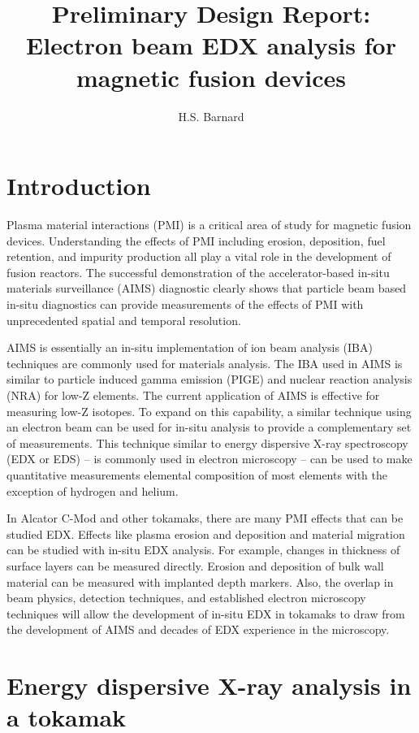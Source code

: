 \documentclass[12pt,letterpaper,final]{article}
\author{H.S. Barnard}
\title{Preliminary Design Report: Electron beam EDX analysis for magnetic fusion devices}
\begin{document}
\maketitle
%
\section{Introduction}

Plasma material interactions (PMI) is a critical area of study for magnetic fusion devices.  Understanding the effects of PMI including erosion, deposition, fuel retention, and impurity production all play a vital role in the development of fusion reactors. The successful demonstration of the accelerator-based in-situ materials surveillance (AIMS) diagnostic clearly shows that particle beam based in-situ diagnostics can provide measurements of the effects of PMI with unprecedented spatial and temporal resolution.

AIMS is essentially an in-situ implementation of ion beam analysis (IBA) techniques are commonly used for materials analysis. The IBA used in AIMS is similar to particle induced gamma emission (PIGE) and nuclear reaction analysis (NRA) for low-Z elements. The current application of AIMS is effective for measuring low-Z isotopes. To expand on this capability, a similar technique using an electron beam can be used for in-situ analysis to provide a complementary set of measurements. This technique similar to energy dispersive X-ray spectroscopy (EDX or EDS) -- is commonly used in electron microscopy -- can be used to make quantitative measurements elemental composition of most elements with the exception  of hydrogen and helium. 

In Alcator C-Mod and other tokamaks, there are many PMI effects that can be studied EDX. Effects like plasma erosion and deposition and material migration can be studied with in-situ EDX analysis. For example, changes in thickness of surface layers can be measured directly. Erosion and deposition of bulk wall material can be measured with implanted depth markers. Also, the overlap in beam physics, detection techniques, and established electron microscopy techniques will allow the development of in-situ EDX in tokamaks to draw from the development of AIMS and decades of EDX experience in the microscopy.

\section{Energy dispersive X-ray analysis in a tokamak}
\end{document}
